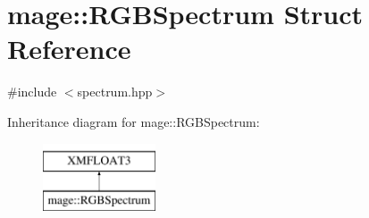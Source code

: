 \hypertarget{structmage_1_1_r_g_b_spectrum}{}\section{mage\+:\+:R\+G\+B\+Spectrum Struct Reference}
\label{structmage_1_1_r_g_b_spectrum}


{\ttfamily \#include $<$spectrum.\+hpp$>$}

Inheritance diagram for mage\+:\+:R\+G\+B\+Spectrum\+:\begin{figure}[H]
\begin{center}
\leavevmode
\includegraphics[height=2.000000cm]{structmage_1_1_r_g_b_spectrum}
\end{center}
\end{figure}
